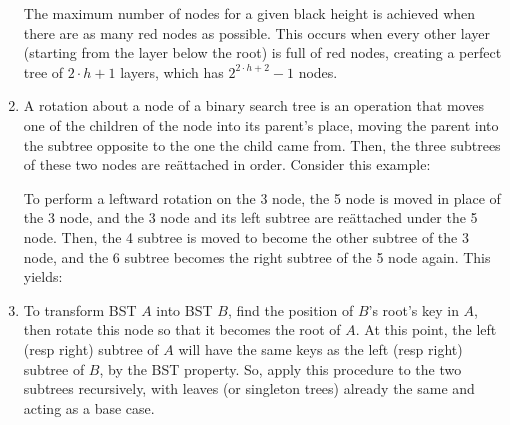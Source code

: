 \documentclass[11pt]{article}
\begin{document}
\begin{enumerate}
  The maximum number of nodes for a given black height is achieved when there are as many red nodes as possible. This occurs when every other layer (starting from the layer below the root) is full of red nodes, creating a perfect tree of \(2\cdot h+1\) layers, which has \(2^{2\cdot h+2}-1\) nodes.
\item
  A rotation about a node of a binary search tree is an operation that moves one of the children of the node into its parent's place, moving the parent into the subtree opposite to the one the child came from. Then, the three subtrees of these two nodes are reättached in order. Consider this example:


  To perform a leftward rotation on the 3 node, the 5 node is moved in place of the 3 node, and the 3 node and its left subtree are reättached under the 5 node. Then, the 4 subtree is moved to become the other subtree of the 3 node, and the 6 subtree becomes the right subtree of the 5 node again. This yields:

\item To transform BST \(A\) into BST \(B\), find the position of \(B\)'s root's key in \(A\), then rotate this node so that it becomes the root of \(A\). At this point, the left (resp right) subtree of \(A\) will have the same keys as the left (resp right) subtree of \(B\), by the BST property. So, apply this procedure to the two subtrees recursively, with leaves (or singleton trees) already the same and acting as a base case.
\end{enumerate}
\end{document}
